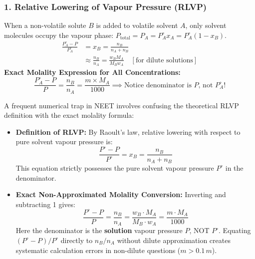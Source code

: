 \documentclass[10pt,twoside,openright]{book}
\begin{document}
\subsubsection{1. Relative Lowering of Vapour Pressure (RLVP)}
When a non-volatile solute $B$ is added to volatile solvent $A$, only solvent molecules occupy the vapour phase: $P_{\text{total}} = P_A = P_A^\circ x_A = P_A^\circ(1 - x_B)$.
\begin{align}
  \frac{P_A^\circ - P}{P_A^\circ} &= x_B = \frac{n_B}{n_A + n_B} \\
  &\approx \frac{n_B}{n_A} = \frac{w_B M_A}{M_B w_A} \quad [\text{for dilute solutions}]
\end{align}
\textbf{Exact Molality Expression for All Concentrations:}
\begin{equation}
  \frac{P_A^\circ - P}{P} = \frac{n_B}{n_A} = \frac{m \times M_A}{1000} \implies \text{Notice denominator is } P\text{, not } P_A^\circ!
\end{equation}

\begin{trapbox}
A frequent numerical trap in NEET involves confusing the theoretical RLVP definition with the exact molality formula:
\begin{itemize}
  \item \textbf{Definition of RLVP:} By Raoult's law, relative lowering with respect to pure solvent vapour pressure is:
  \begin{equation*}
    \frac{P^\circ - P}{P^\circ} = x_B = \frac{n_B}{n_A + n_B}
  \end{equation*}
  This equation strictly possesses the pure solvent vapour pressure $P^\circ$ in the denominator.
  \item \textbf{Exact Non-Approximated Molality Conversion:} Inverting and subtracting 1 gives:
  \begin{equation*}
    \frac{P^\circ - P}{P} = \frac{n_B}{n_A} = \frac{w_B \cdot M_A}{M_B \cdot w_A} = \frac{m \cdot M_A}{1000}
  \end{equation*}
  Here the denominator is the \textbf{solution} vapour pressure $P$, NOT $P^\circ$. Equating $(P^\circ - P)/P^\circ$ directly to $n_B/n_A$ without dilute approximation creates systematic calculation errors in non-dilute questions ($m > 0.1\,\si{m}$).
\end{itemize}
\end{trapbox}
\end{document}

